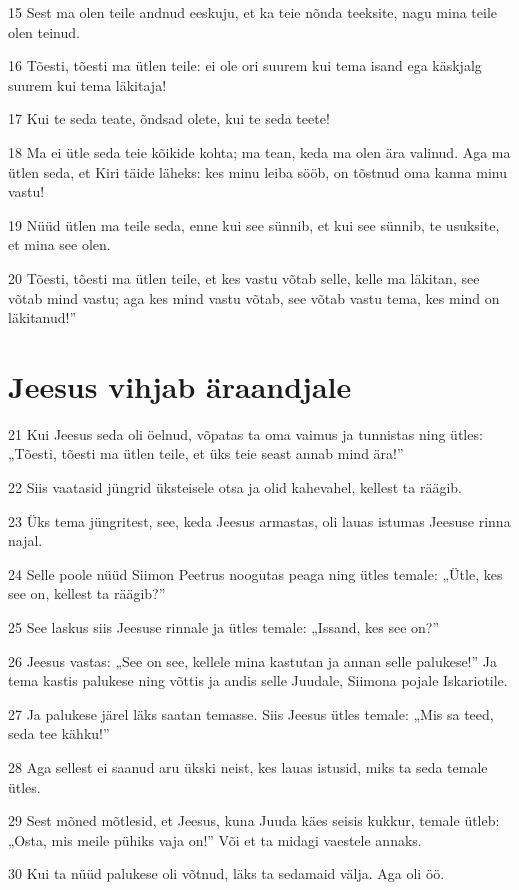\par 15 Sest ma olen teile andnud eeskuju, et ka teie nõnda teeksite, nagu mina teile olen teinud.
\par 16 Tõesti, tõesti ma ütlen teile: ei ole ori suurem kui tema isand ega käskjalg suurem kui tema läkitaja!
\par 17 Kui te seda teate, õndsad olete, kui te seda teete!
\par 18 Ma ei ütle seda teie kõikide kohta; ma tean, keda ma olen ära valinud. Aga ma ütlen seda, et Kiri täide läheks: kes minu leiba sööb, on tõstnud oma kanna minu vastu!
\par 19 Nüüd ütlen ma teile seda, enne kui see sünnib, et kui see sünnib, te usuksite, et mina see olen.
\par 20 Tõesti, tõesti ma ütlen teile, et kes vastu võtab selle, kelle ma läkitan, see võtab mind vastu; aga kes mind vastu võtab, see võtab vastu tema, kes mind on läkitanud!”

\section*{Jeesus vihjab äraandjale}

\par 21 Kui Jeesus seda oli öelnud, võpatas ta oma vaimus ja tunnistas ning ütles: „Tõesti, tõesti ma ütlen teile, et üks teie seast annab mind ära!”
\par 22 Siis vaatasid jüngrid üksteisele otsa ja olid kahevahel, kellest ta räägib.
\par 23 Üks tema jüngritest, see, keda Jeesus armastas, oli lauas istumas Jeesuse rinna najal.
\par 24 Selle poole nüüd Siimon Peetrus noogutas peaga ning ütles temale: „Ütle, kes see on, kellest ta räägib?”
\par 25 See laskus siis Jeesuse rinnale ja ütles temale: „Issand, kes see on?”
\par 26 Jeesus vastas: „See on see, kellele mina kastutan ja annan selle palukese!” Ja tema kastis palukese ning võttis ja andis selle Juudale, Siimona pojale Iskariotile.
\par 27 Ja palukese järel läks saatan temasse. Siis Jeesus ütles temale: „Mis sa teed, seda tee kähku!”
\par 28 Aga sellest ei saanud aru ükski neist, kes lauas istusid, miks ta seda temale ütles.
\par 29 Sest mõned mõtlesid, et Jeesus, kuna Juuda käes seisis kukkur, temale ütleb: „Osta, mis meile pühiks vaja on!” Või et ta midagi vaestele annaks.
\par 30 Kui ta nüüd palukese oli võtnud, läks ta sedamaid välja. Aga oli öö.

